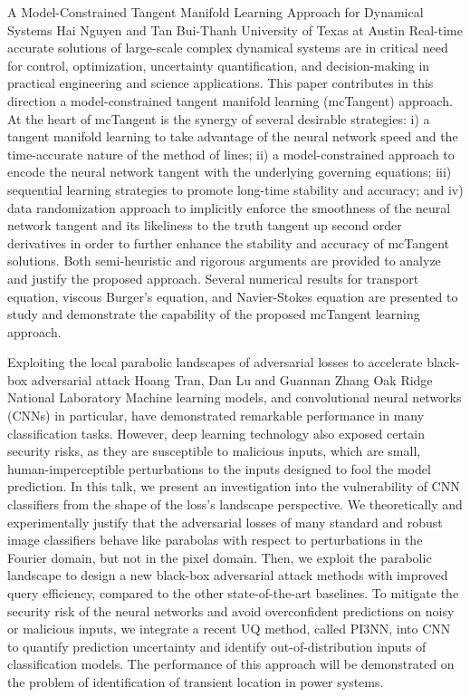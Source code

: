\vspace{1.5ex}
\abs
{A Model-Constrained Tangent Manifold Learning Approach for Dynamical Systems}
{Hai Nguyen and Tan Bui-Thanh}
{University of Texas at Austin}
{Real-time accurate solutions of large-scale complex dynamical systems are in critical need for control, optimization, uncertainty quantification, and decision-making in practical engineering and science applications. This paper contributes in this direction a model-constrained tangent manifold learning (mcTangent) approach. At the heart of mcTangent is the synergy of several desirable strategies: i) a tangent manifold learning to take advantage of the neural network speed and the time-accurate nature of the method of lines; ii) a model-constrained approach to encode the neural network tangent with the underlying governing equations; iii) sequential learning strategies to promote long-time stability and accuracy; and iv) data randomization approach to implicitly enforce the smoothness of the neural network tangent and its likeliness to the truth tangent up second order derivatives in order to further enhance the stability and accuracy of mcTangent solutions. Both semi-heuristic and rigorous arguments are provided to analyze and justify the proposed approach. Several numerical results for transport equation, viscous Burger's equation, and Navier-Stokes equation are presented to study and demonstrate the capability of the proposed mcTangent learning approach.}


\vspace{1.5ex}
\abs
{Exploiting the local parabolic landscapes of adversarial losses to accelerate black-box adversarial attack}
{Hoang Tran, Dan Lu and Guannan Zhang}
{Oak Ridge National Laboratory}
{Machine learning models, and convolutional neural networks (CNNs) in particular, have demonstrated remarkable performance in many classification tasks. However, deep learning technology also exposed certain security risks, as they are susceptible to malicious inputs, which are small, human-imperceptible perturbations to the inputs designed to fool the model prediction. In this talk, we present an investigation into the vulnerability of CNN classifiers from the shape of the loss’s landscape perspective. We theoretically and experimentally justify that the adversarial losses of many standard and robust image classifiers behave like parabolas with respect to perturbations in the Fourier domain, but not in the pixel domain. Then, we exploit the parabolic landscape to design a new black-box adversarial attack methods with improved query efficiency, compared to the other state-of-the-art baselines. To mitigate the security risk of the neural networks and avoid overconfident predictions on noisy or malicious inputs, we integrate a recent UQ method, called PI3NN, into CNN to quantify prediction uncertainty and identify out-of-distribution inputs of classification models. The performance of this approach will be demonstrated on the problem of identification of transient location in power systems.}



